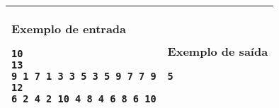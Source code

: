 \begin{table}[!h]
\centering
\begin{tabular}{|l|l|}
\hline
\begin{minipage}[t]{3in}
\textbf{Exemplo de entrada}
\begin{verbatim}
10
13
9 1 7 1 3 3 5 3 5 9 7 7 9
12
6 2 4 2 10 4 8 4 6 8 6 10
\end{verbatim}
\vspace{1mm}
\end{minipage}
&
\begin{minipage}[t]{3in}
\textbf{Exemplo de saída}
\begin{verbatim}
5
\end{verbatim}
\vspace{1mm}
\end{minipage} \\
\hline
\end{tabular}
\end{table}
